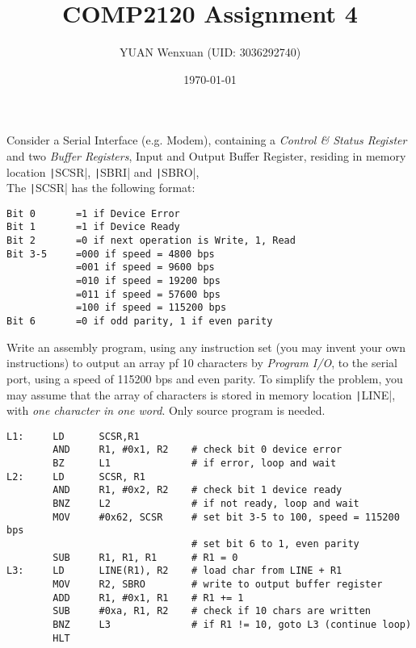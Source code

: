 \documentclass[answers]{exam}
\title{COMP2120 Assignment 4}
\author{YUAN Wenxuan (UID: 3036292740)}
\date{\today}
\begin{document}
\maketitle
\begin{questions}

    \question Consider a Serial Interface (e.g. Modem),
    containing a \textit{Control \& Status Register} and two \textit{Buffer Registers}, Input and Output Buffer Register,
    residing in memory location \texttt|SCSR|, \texttt|SBRI| and \texttt|SBRO|, \\
    The \texttt|SCSR| has the following format:

    \begin{verbatim}
Bit 0       =1 if Device Error
Bit 1       =1 if Device Ready
Bit 2       =0 if next operation is Write, 1, Read
Bit 3-5     =000 if speed = 4800 bps
            =001 if speed = 9600 bps
            =010 if speed = 19200 bps
            =011 if speed = 57600 bps
            =100 if speed = 115200 bps
Bit 6       =0 if odd parity, 1 if even parity
    \end{verbatim}

    Write an assembly program, using any instruction set (you may invent your own instructions) to output an array pf 10 characters by \textit{Program I/O}, to the serial port, using a speed of 115200 bps and even parity.
    To simplify the problem, you may assume that the array of characters is stored in memory location \texttt|LINE|, with \textit{one character in one word}.
    Only source program is needed.

    \begin{solution}
        \begin{verbatim}
L1:     LD      SCSR,R1
        AND     R1, #0x1, R2    # check bit 0 device error
        BZ      L1              # if error, loop and wait
L2:     LD      SCSR, R1
        AND     R1, #0x2, R2    # check bit 1 device ready
        BNZ     L2              # if not ready, loop and wait
        MOV     #0x62, SCSR     # set bit 3-5 to 100, speed = 115200 bps
                                # set bit 6 to 1, even parity
        SUB     R1, R1, R1      # R1 = 0
L3:     LD      LINE(R1), R2    # load char from LINE + R1
        MOV     R2, SBRO        # write to output buffer register
        ADD     R1, #0x1, R1    # R1 += 1
        SUB     #0xa, R1, R2    # check if 10 chars are written
        BNZ     L3              # if R1 != 10, goto L3 (continue loop)
        HLT
        \end{verbatim}


\end{solution}
\end{questions}
\end{document}
